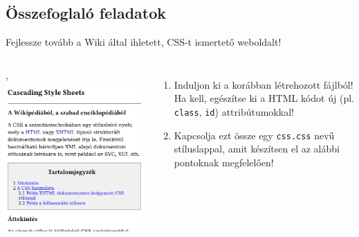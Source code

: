 \subsection{Összefoglaló feladatok}


\begin{frame}
  Fejlessze tovább a Wiki által ihletett, CSS-t ismertető weboldalt!
  \begin{columns}[c]
      \begin{exampleblock}{, }
        \includegraphics[width=\textwidth]{css1.png}
      \end{exampleblock}
      \begin{enumerate}
        \footnotesize
        \item Induljon ki a korábban létrehozott  fájlból! Ha kell, egészítse ki a HTML kódot új (pl. \texttt{class}, \texttt{id}) attribútumokkal!
        \item Kapcsolja ezt össze egy \texttt{css.css} nevű stíluslappal, amit készítsen el az alábbi pontoknak megfelelően!

\end{enumerate}
\end{columns}
\end{frame}

